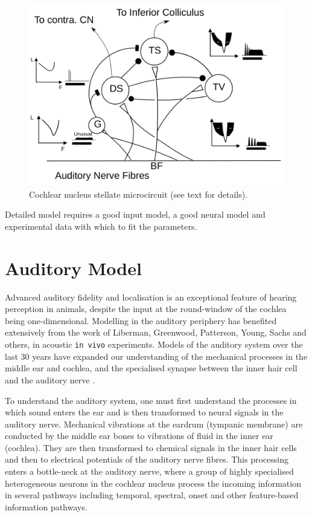 \begin{figure}[ht!]
  \centering
  \includegraphics[width=\textwidth]{gfx/CNcircuit}
  \caption{Cochlear nucleus stellate microcircuit (see text for details). }
  \label{fig:microcircuit}
\end{figure}


Detailed model requires a good input model, a good neural model and experimental
data with which to fit the parameters.  

\section{Auditory Model}

Advanced auditory fidelity and localisation is an exceptional feature
of hearing perception in animals, despite the input at the
round-window of the cochlea being one-dimensional.  Modelling in the
auditory periphery has benefited extensively from the work of
Liberman, Greenwood, Patterson, Young, Sachs and others, in acoustic
\texttt{in vivo} experiments. Models of the auditory
system over the last 30 years have expanded our understanding of the
mechanical processes in the middle ear and cochlea, and the specialised
synapse between the inner hair cell and the auditory nerve
\citep{DavisVoigt:1991,Carney:1993,MeddisHewittEtAl:1990}.


To understand the auditory system, one
must first understand the processes in which sound enters the ear and is then
transformed to neural signals in the auditory nerve. Mechanical vibrations at
the eardrum (tympanic membrane) are conducted by the middle ear bones to vibrations of fluid in
the inner ear (cochlea). They are then transformed to chemical signals in the
inner hair cells and then to electrical potentials of the auditory nerve
fibres. This processing enters a bottle-neck at the auditory nerve, where a
group of highly specialised heterogeneous neurons in the cochlear nucleus
process the incoming information in several pathways including temporal,
spectral, onset and other feature-based information pathways.

